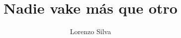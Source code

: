 \documentclass[fontsize=11pt]{scrartcl}
\begin{document}
\title{Nadie vake más que otro}
\author{Lorenzo Silva}
\date{}

\maketitle
\clearpage

\parskip0pt


\newcommand{\sidenote}[1]{\marginpar[#1]{\small\textit{#1}}}
\newcommand{\grammarnote}[1]{\marginpar[#1]{\footnotesize{G#1}}}
\newcommand{\ul}[1]{\underline{#1}}
\newcommand{\nwfootnote}[1]{\footnote{#1}}
\newcommand{\fillmiss}{\rule{2cm}{0.4pt}~}
\newcommand{\choice}{$\Box$}
\newcommand{\correctchoice}{\framebox[1em]{\ding{51}}}
\newcommand{\falsechoice}{\framebox[1em]{\ding{53}}}
\newcommand{\correction}[1]{~\ding{43}~\textbf{\textsl{#1}}}
\newcommand{\FIN}{\textbf{--- FIN ---}\clearpage}

\newcommand{\mdash}{-}

\begin{paracol}{2}

\end{paracol}


\setlength{\parindent}{0em}

\raggedright

\end{document}
